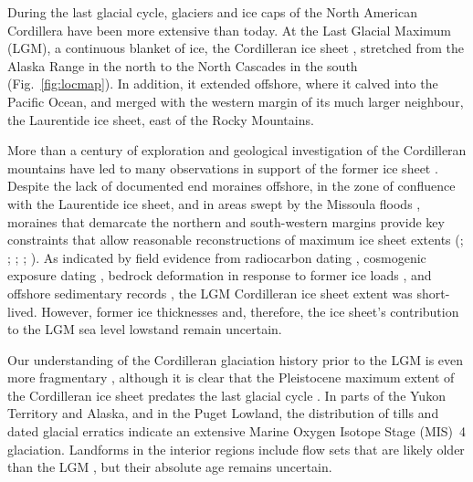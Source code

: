 \documentclass[tc, manuscript]{copernicus}
\begin{document}
\introduction
\label{sec:intro}

During the last glacial cycle, glaciers and ice caps of the North American
Cordillera have been more extensive than today. At the Last Glacial
Maximum (LGM),
a continuous blanket of ice, the Cordilleran ice sheet
\citep{Dawson.1888}, stretched from the Alaska Range in the north to the
North Cascades in the south (Fig.~\ref{fig:locmap}).
In addition, it extended offshore, where it calved
into the Pacific Ocean, and merged with the western margin of its much larger
neighbour, the Laurentide ice sheet, east of the Rocky Mountains.

More than a century of exploration and geological investigation of the
Cordilleran mountains have led to many observations in support of the former
ice sheet
    \citep{Jackson.Clague.1991}.
Despite the lack of documented end moraines offshore, in the zone of confluence
with the Laurentide ice sheet, and in areas swept by the Missoula floods
    \citep{Carrara.etal.1996},
moraines that demarcate the northern and south-western margins provide key
constraints that allow reasonable reconstructions of maximum ice sheet extents
    (\citealp{Prest.etal.1968}; \citealp[Fig. 1.12]{Clague.1989};
     \citealp{Duk-Rodkin.1999};
     \citealp{Booth.etal.2003}; \citealp{Dyke.2004}).
As indicated by field evidence from radiocarbon dating
    \citep{Clague.etal.1980, Clague.1985, Clague.1986, Porter.Swanson.1998,
           Menounos.etal.2008},
cosmogenic exposure dating
    \citep{Stroeven.etal.2010, Stroeven.etal.2014, Margold.etal.2014},
bedrock deformation in response to former ice loads
    \citep{Clague.James.2002, Clague.etal.2005},
and offshore sedimentary records
    \citep{Cosma.etal.2008, Davies.etal.2011},
the LGM Cordilleran ice sheet extent was short-lived.
However, former ice thicknesses and, therefore, the ice sheet's contribution to
the LGM sea level lowstand
    \citep{Carlson.Clark.2012, Clark.Mix.2002}
remain uncertain.

Our understanding of the Cordilleran glaciation history prior to the LGM is
even more fragmentary
    \citep{Barendregt.Irving.1998, Kleman.etal.2010, Rutter.etal.2012},
although it is clear that the Pleistocene maximum extent of the Cordilleran
ice sheet predates the last glacial cycle
    \citep{Hidy.etal.2013}.
In parts of the Yukon Territory and Alaska, and in the Puget Lowland,
the distribution of tills
    \citep{Turner.etal.2013, Troost.2014}
and dated glacial erratics
    \citep{Ward.etal.2007, Ward.etal.2008, Briner.Kaufman.2008,
           Stroeven.etal.2010, Stroeven.etal.2014}
indicate an extensive Marine Oxygen Isotope Stage (MIS)~4 glaciation.
Landforms in the interior regions include flow sets that are likely
older than the LGM
    \citep[Fig.~2]{Kleman.etal.2010},
but their absolute age remains uncertain.
\end{document}
